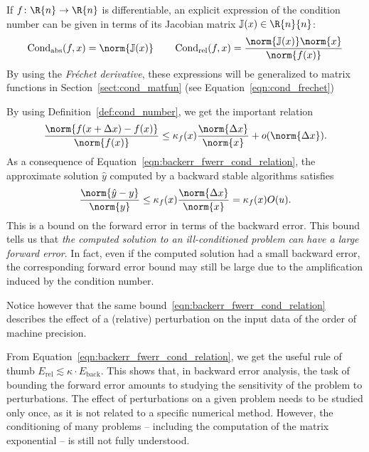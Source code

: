 If $f\colon\R{n}\to\R{n}$ is differentiable, an explicit expression of the condition number can be given in terms of its Jacobian matrix $\mathbb{J}(x)\in\R{n}{n}$:
\[
	\operatorname{Cond}_{\text{abs}}(f,x)=\norm{\mathbb{J}(x)}\qquad\operatorname{Cond}_{\text{rel}}(f,x)=\frac{\norm{\mathbb{J}(x)}\norm{x}}{\norm{f(x)}}
\]
By using the \emph{Fréchet derivative}, these expressions will be generalized to matrix functions in Section~\ref{sect:cond_matfun} (see Equation~\eqref{eqn:cond_frechet})

By using Definition~\ref{def:cond_number}, we get the important relation
\begin{equation}\label{eqn:backerr_fwerr_cond_relation}
	\frac{\norm{f(x+\Delta{x})-f(x)}}{\norm{f(x)}}\le\kappa_f(x)\frac{\norm{\Delta{x}}}{\norm{x}}+o(\norm{\Delta{x}}).
\end{equation}
As a consequence of Equation~\eqref{eqn:backerr_fwerr_cond_relation}, the approximate solution $\hat{y}$ computed by a backward stable algorithms satisfies
\[
	\frac{\norm{\hat{y}-y}}{\norm{y}}\le\kappa_f(x)\frac{\norm{\Delta{x}}}{\norm{x}} = \kappa_f(x)O(u).
\]
This is a bound on the forward error in terms of the backward error. This bound tells us that \emph{the computed solution to an ill-conditioned problem can have a large forward error}. In fact, even if the computed solution had a small backward error, the corresponding forward error bound may still be large due to the amplification induced by the condition number.

Notice however that the same bound~\eqref{eqn:backerr_fwerr_cond_relation} describes the effect of a (relative) perturbation on the input data of the order of machine precision.

From Equation~\eqref{eqn:backerr_fwerr_cond_relation}, we get the useful rule of thumb $E_{\text{rel}}\lesssim\kappa\cdot E_{\text{back}}$.
This shows that, in backward error analysis, the task of bounding the forward error amounts to studying the sensitivity of the problem to perturbations. The effect of perturbations on a given problem needs to be studied only once, as it is not related to a specific numerical method. However, the conditioning of many problems -- including the computation of the matrix exponential -- is still not fully understood.

